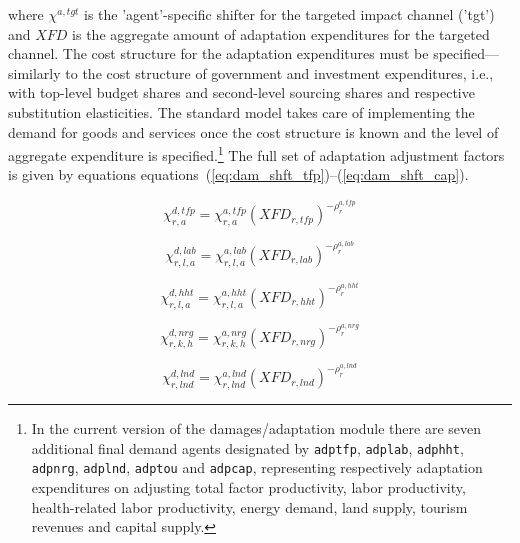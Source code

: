 \documentclass[11pt,letterpaper]{report}
\begin{document}
\noindent where $\chi^{a,\mathit{tgt}}$ is the 'agent'-specific
shifter for the targeted impact channel ('tgt') and
$\mathit{XFD}$ is the aggregate amount of adaptation expenditures
for the targeted channel. The cost structure for the adaptation
expenditures must be specified---similarly to the cost
structure of government and investment expenditures, i.e.,
with top-level budget shares and second-level sourcing
shares and respective substitution elasticities. The
standard model takes care of implementing the demand for
goods and services once the cost structure is known and
the level of aggregate expenditure is specified.\footnote{In the
current version of the damages/adaptation module there
are seven additional final demand agents designated
by \texttt{adptfp}, \texttt{adplab}, \texttt{adphht}, \texttt{adpnrg},
\texttt{adplnd}, \texttt{adptou} and \texttt{adpcap}, representing
respectively adaptation expenditures on
adjusting total factor productivity, labor productivity,
health-related labor productivity, energy demand,
land supply, tourism revenues and capital supply.}
The full set of adaptation adjustment factors is
given by equations equations~(\ref{eq:dam_shft_tfp})--(\ref{eq:dam_shft_cap}).

\begin{equation}
\label{eq:dam_shft_tfp}
\chi^{d,\mathit{tfp}}_{r,a}
= \chi^{a,\mathit{tfp}}_{r,a} \left(
\mathit{XFD}_{r,\mathit{tfp}}
\right)^{-\rho^{a,\mathit{tfp}}_{r}}
\end{equation}

\begin{equation}
\label{eq:dam_shft_lab}
\chi^{d,\mathit{lab}}_{r,l,a}
= \chi^{a,\mathit{lab}}_{r,l,a} \left(
\mathit{XFD}_{r,\mathit{lab}}
\right)^{-\rho^{a,\mathit{lab}}_{r}}
\end{equation}

\begin{equation}
\label{eq:dam_shft_hht}
\chi^{d,\mathit{hht}}_{r,l,a}
= \chi^{a,\mathit{hht}}_{r,l,a} \left(
\mathit{XFD}_{r,\mathit{hht}}
\right)^{-\rho^{a,\mathit{hht}}_{r}}
\end{equation}

\begin{equation}
\label{eq:dam_shft_nrg}
\chi^{d,\mathit{nrg}}_{r,k,h}
= \chi^{a,\mathit{nrg}}_{r,k,h} \left(
\mathit{XFD}_{r,\mathit{nrg}}
\right)^{-\rho^{a,\mathit{nrg}}_{r}}
\end{equation}

\begin{equation}
\label{eq:dam_shft_lnd}
\chi^{d,\mathit{lnd}}_{r,\mathit{lnd}}
= \chi^{a,\mathit{lnd}}_{r,\mathit{lnd}} \left(
\mathit{XFD}_{r,\mathit{lnd}}
\right)^{-\rho^{a,\mathit{lnd}}_{r}}
\end{equation}
\end{document}
